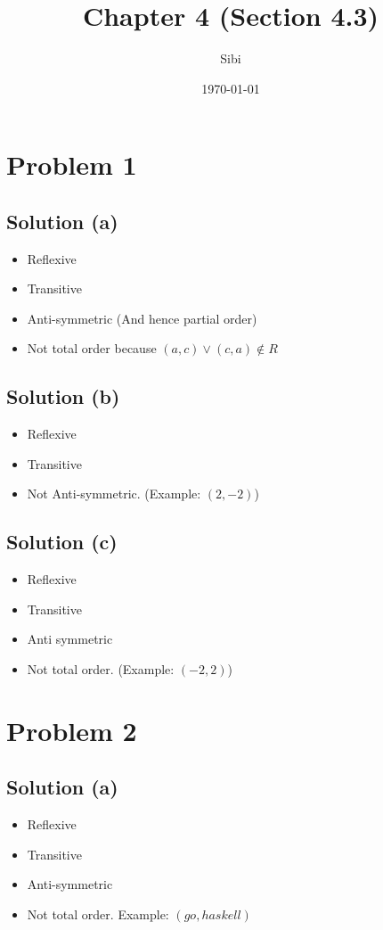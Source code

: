 \documentclass{article}
\begin{document}
\title{Chapter 4 (Section 4.3)}
\author{Sibi}
\date{\today}
\maketitle
\newpage

\section{Problem 1}
\subsection{Solution (a)}

\begin{itemize}
\item Reflexive
\item Transitive
\item Anti-symmetric (And hence partial order)
\item Not total order because $(a,c) \lor (c,a) \notin R$
\end{itemize}

\subsection{Solution (b)}
\begin{itemize}
\item Reflexive 
\item Transitive
\item Not Anti-symmetric. (Example: $(2,-2)$)
\end{itemize}

\subsection{Solution (c)}
\begin{itemize}
\item Reflexive
\item Transitive
\item Anti symmetric
\item Not total order. (Example: $(-2,2)$)
\end{itemize}

\section{Problem 2}
\subsection{Solution (a)}
\begin{itemize}
\item Reflexive
\item Transitive
\item Anti-symmetric
\item Not total order. Example: $(go, haskell)$
\end{itemize}
\end{document}
